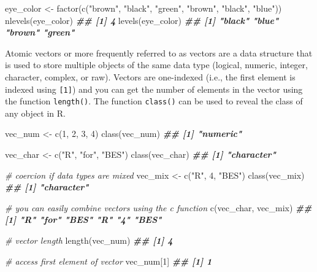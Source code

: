 \documentclass[
]{book}
\newenvironment{Shaded}{\begin{snugshade}}{\end{snugshade}}
\newcommand{\CommentTok}[1]{\textcolor[rgb]{0.56,0.35,0.01}{\textit{#1}}}
\newcommand{\DecValTok}[1]{\textcolor[rgb]{0.00,0.00,0.81}{#1}}
\newcommand{\DocumentationTok}[1]{\textcolor[rgb]{0.56,0.35,0.01}{\textbf{\textit{#1}}}}
\newcommand{\FunctionTok}[1]{\textcolor[rgb]{0.00,0.00,0.00}{#1}}
\newcommand{\NormalTok}[1]{#1}
\newcommand{\OtherTok}[1]{\textcolor[rgb]{0.56,0.35,0.01}{#1}}
\newcommand{\StringTok}[1]{\textcolor[rgb]{0.31,0.60,0.02}{#1}}
\begin{document}
\begin{Shaded}
\begin{Highlighting}[]
\NormalTok{eye\_color }\OtherTok{\textless{}{-}} \FunctionTok{factor}\NormalTok{(}\FunctionTok{c}\NormalTok{(}\StringTok{"brown"}\NormalTok{, }\StringTok{"black"}\NormalTok{, }\StringTok{"green"}\NormalTok{, }\StringTok{"brown"}\NormalTok{, }\StringTok{"black"}\NormalTok{, }\StringTok{"blue"}\NormalTok{))}
\FunctionTok{nlevels}\NormalTok{(eye\_color)}
\DocumentationTok{\#\# [1] 4}
\FunctionTok{levels}\NormalTok{(eye\_color)}
\DocumentationTok{\#\# [1] "black" "blue"  "brown" "green"}
\end{Highlighting}
\end{Shaded}

Atomic vectors or more frequently referred to as vectors are a data structure that is used to store multiple objects of the same data type (logical, numeric, integer, character, complex, or raw). Vectors are one-indexed (i.e., the first element is indexed using \texttt{{[}1{]}}) and you can get the number of elements in the vector using the function \texttt{length()}. The function \texttt{class()} can be used to reveal the class of any object in R.

\begin{Shaded}
\begin{Highlighting}[]
\NormalTok{vec\_num }\OtherTok{\textless{}{-}} \FunctionTok{c}\NormalTok{(}\DecValTok{1}\NormalTok{, }\DecValTok{2}\NormalTok{, }\DecValTok{3}\NormalTok{, }\DecValTok{4}\NormalTok{)}
\FunctionTok{class}\NormalTok{(vec\_num)}
\DocumentationTok{\#\# [1] "numeric"}

\NormalTok{vec\_char }\OtherTok{\textless{}{-}} \FunctionTok{c}\NormalTok{(}\StringTok{"R"}\NormalTok{, }\StringTok{"for"}\NormalTok{, }\StringTok{"BES"}\NormalTok{)}
\FunctionTok{class}\NormalTok{(vec\_char)}
\DocumentationTok{\#\# [1] "character"}

\CommentTok{\# coercion if data types are mixed}
\NormalTok{vec\_mix }\OtherTok{\textless{}{-}} \FunctionTok{c}\NormalTok{(}\StringTok{"R"}\NormalTok{, }\DecValTok{4}\NormalTok{, }\StringTok{"BES"}\NormalTok{)}
\FunctionTok{class}\NormalTok{(vec\_mix)}
\DocumentationTok{\#\# [1] "character"}

\CommentTok{\# you can easily combine vectors using the c function}
\FunctionTok{c}\NormalTok{(vec\_char, vec\_mix)}
\DocumentationTok{\#\# [1] "R"   "for" "BES" "R"   "4"   "BES"}

\CommentTok{\# vector length}
\FunctionTok{length}\NormalTok{(vec\_num)}
\DocumentationTok{\#\# [1] 4}

\CommentTok{\# access first element of vector}
\NormalTok{vec\_num[}\DecValTok{1}\NormalTok{]}
\DocumentationTok{\#\# [1] 1}
\end{Highlighting}
\end{Shaded}
\end{document}
